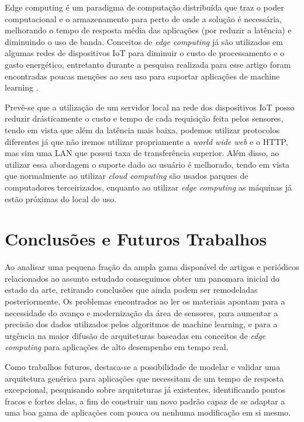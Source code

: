 \documentclass[12pt]{article}
\begin{document}
Edge computing é um paradigma de computação distribuída que traz o poder computacional e o armazenamento para perto de onde a solução é necessária, melhorando o tempo de resposta média das aplicações (por reduzir a latência) e diminuindo o uso de banda. Conceitos de \emph{edge computing} já são utilizados em algumas redes de dispositivos IoT para diminuir o custo de processamento e o gasto energético, entretanto durante a pesquisa realizada para esse artigo foram encontradas poucas menções ao seu uso para suportar aplicações de machine learning \cite{vitali}.

Prevê-se que a utilização de um servidor local na rede dos dispositivos IoT posso reduzir drásticamente o custo e tempo de cada requisição feita pelos sensores, tendo em vista que além da latência mais baixa, podemos utilizar protocolos diferentes já que não iremos utilizar propriamente a \emph{world wide web} e o HTTP, mas sim uma LAN que possui taxa de transferência superior. Além disso, ao utilizar essa abordagem o suporte dado ao usuário é melhorado, tendo em vista que normalmente ao utilizar \emph{cloud computing} são usados parques de computadores terceirizados, enquanto ao utilizar \emph{edge computing} as máquinas já estão próximas do local de uso.

\section{Conclusões e Futuros Trabalhos}

Ao analisar uma pequena fração da ampla gama disponível de artigos e periódicos relacionados ao assunto estudado conseguimos obter um panomara inicial do estado da arte, retirando conclusões que ainda podem ser remodeladas posteriormente. Os problemas encontrados ao ler os materiais apontam para a necessidade do avanço e modernização da área de sensores, para aumentar a precisão dos dados utilizados pelos algoritmos de machine learning, e para a urgência na maior difusão de arquiteturas baseadas em conceitos de \emph{edge computing} para aplicações de alto desempenho em tempo real.

Como trabalhos futuros, destaca-se a possibilidade de modelar e validar uma arquitetura genérica para aplicações que necessitam de um tempo de resposta excepcional, pesquisando sobre arquiteturas já existentes, identificando pontos fracos e fortes delas, a fim de construir um novo padrão capaz de se adaptar a uma boa gama de aplicações com pouca ou nenhuma modificação em si mesmo.

\nocite{*}
\medskip



\end{document}
